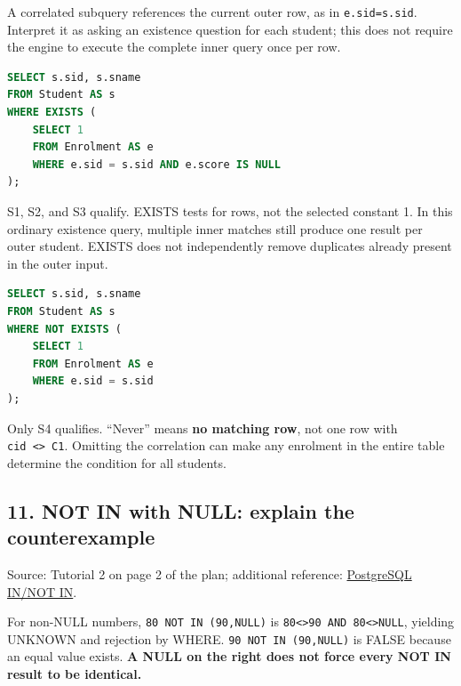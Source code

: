 A correlated subquery references the current outer row, as in \texttt{e.\allowbreak{}sid=s.\allowbreak{}sid}. Interpret it as asking an existence question for each student; this does not require the engine to execute the complete inner query once per row.

\Needspace{135pt}
\begin{lstlisting}[language=SQL]
SELECT s.sid, s.sname
FROM Student AS s
WHERE EXISTS (
    SELECT 1
    FROM Enrolment AS e
    WHERE e.sid = s.sid AND e.score IS NULL
);
\end{lstlisting}

S1, S2, and S3 qualify. EXISTS tests for rows, not the selected constant 1. In this ordinary existence query, multiple inner matches still produce one result per outer student. EXISTS does not independently remove duplicates already present in the outer input.

\Needspace{135pt}
\begin{lstlisting}[language=SQL]
SELECT s.sid, s.sname
FROM Student AS s
WHERE NOT EXISTS (
    SELECT 1
    FROM Enrolment AS e
    WHERE e.sid = s.sid
);
\end{lstlisting}

Only S4 qualifies. ``Never'' means \textbf{no matching row}, not one row with \texttt{cid\ \textless{}\textgreater{}\ \textquotesingle{}C1\textquotesingle{}}. Omitting the correlation can make any enrolment in the entire table determine the condition for all students.

\subsection{11. NOT IN with NULL: explain the counterexample}\label{06_sql_queries_en-not-in-with-null-explain-the-counterexample}

Source: Tutorial 2 on page 2 of the plan; additional reference: \href{https://www.postgresql.org/docs/18/functions-subquery.html\#FUNCTIONS-SUBQUERY-NOTIN}{PostgreSQL IN/NOT IN}.

For non-NULL numbers, \texttt{80\ NOT\ IN\ (\allowbreak{}90,\allowbreak{}NULL)\allowbreak{}} is \texttt{80\textless{}\textgreater{}90\ AND\ 80\textless{}\textgreater{}NULL}, yielding UNKNOWN and rejection by WHERE. \texttt{90\ NOT\ IN\ (\allowbreak{}90,\allowbreak{}NULL)\allowbreak{}} is FALSE because an equal value exists. \textbf{A NULL on the right does not force every NOT IN result to be identical.}

